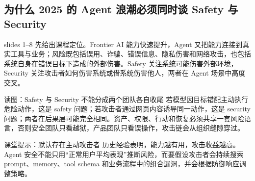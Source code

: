 \subsection{为什么 2025 的 Agent 浪潮必须同时谈 Safety 与 Security}

slides 1--8 先给出课程定位。Frontier AI 能力快速提升，Agent 又把能力连接到真实工具与业务；风险既包括误用、诈骗、错误信息、隐私伤害和网络攻击，也包括系统自身在错误目标下造成的外部伤害。Safety 关注系统可能伤害外部环境，Security 关注攻击者如何伤害系统或借系统伤害他人，两者在 Agent 场景中高度交叉。


\begin{knowledgebox}{读图：Safety 与 Security 不能分成两个团队各自收尾}
若模型因目标错配主动执行危险动作，这是 safety 问题；若攻击者通过网页内容诱导同一动作，这是 security 问题；两者在后果层可能完全相同。资产、权限、行动和恢复必须共享一套风险语言，否则安全团队只看越狱，产品团队只看误操作，攻击链会从组织缝隙穿过。
\end{knowledgebox}

\begin{warningbox}{课堂提示：默认存在主动攻击者}
历史经验表明，能力越有用，攻击收益越高。Agent 安全不能只用“正常用户平均表现”推断风险，而要假设攻击者会持续搜索 prompt、memory、tool schema 和业务流程中的组合漏洞，并会根据防御响应调整策略。
\end{warningbox}

